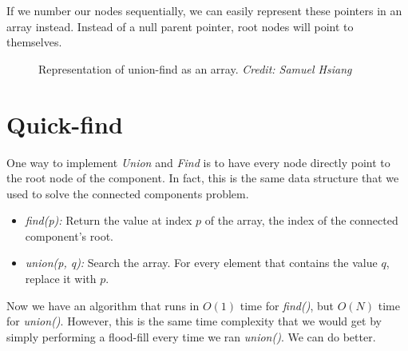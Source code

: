 \documentclass{article}
\begin{document}
If we number our nodes sequentially, we can easily represent these pointers in an array instead. Instead of a null parent pointer, root nodes will point to themselves.

\begin{figure}[h]
\centering
{
}
\caption{Representation of union-find as an array. \textit{Credit: Samuel Hsiang}}
\end{figure}

\section{Quick-find}

One way to implement \textit{Union} and \textit{Find} is to have every node directly point to the root node of the component. In fact, this is the same data structure that we used to solve the connected components problem.

\begin{itemize}
    \item \textit{find(p):} Return the value at index $p$ of the array, the index of the connected component's root.
    \item \textit{union(p, q):} Search the array. For every element that contains the value $q$, replace it with $p$.
\end{itemize}

Now we have an algorithm that runs in $O(1)$ time for \textit{find()}, but $O(N)$ time for \textit{union()}. However, this is the same time complexity that we would get by simply performing a flood-fill every time we ran \textit{union()}. We can do better.
\end{document}
